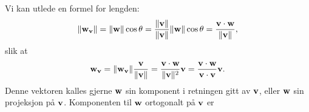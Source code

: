 %
Vi kan utlede en formel for lengden:
\[
\|\mathbf{w}_{\mathbf{v}}\|=\|\mathbf{w}\| \cos \theta=\frac{\|\mathbf{v}\|}{\|\mathbf{v}\|} \|\mathbf{w}\| \cos \theta =\frac{\mathbf{v} \cdot \mathbf{w}}{\|\mathbf{v}\|},
\]
slik at
\[
\mathbf{w}_{\mathbf{v}}=\|\mathbf{w}_{\mathbf{v}}\|\frac{\mathbf{v}}{\|\mathbf{v}\|}=\frac{\mathbf{v} \cdot \mathbf{w}}{\|\mathbf{v}\|^2}\mathbf{v}=\frac{\mathbf{v} \cdot \mathbf{w}}{\mathbf{v} \cdot \mathbf{v}}\mathbf{v}.
\]
Denne vektoren kalles gjerne $\mathbf{w}$ sin komponent i retningen gitt av $\mathbf{v}$, eller $\mathbf{w}$ sin projeksjon på $\mathbf{v}$. Komponenten til $\mathbf{w}$ ortogonalt på $\mathbf{v}$ er 

